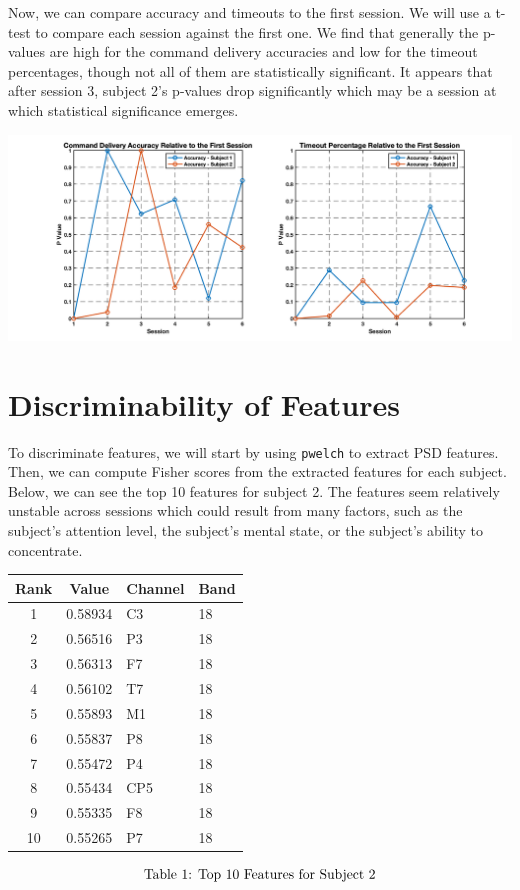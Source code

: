 \documentclass[12pt]{article}
\begin{document}
Now, we can compare accuracy and timeouts to the first session. We will use a t-test to compare each session against the first one. We find that generally the p-values are high for the command delivery accuracies and low for the timeout percentages, though not all of them are statistically significant. It appears that after session 3, subject 2's p-values drop significantly which may be a session at which statistical significance emerges.

\begin{center}
    \includegraphics[width=\textwidth]{1_3.png}
\end{center}

\section{Discriminability of Features}
To discriminate features, we will start by using \texttt{pwelch} to extract PSD features. Then, we can compute Fisher scores from the extracted features for each subject. Below, we can see the top 10 features for subject 2. The features seem relatively unstable across sessions which could result from many factors, such as the subject's attention level, the subject's mental state, or the subject's ability to concentrate.

\begin{center}
    \begin{tabular}{c c l l}
        \toprule
        Rank & Value   & Channel & Band \\
        \midrule
        1    & 0.58934 & C3      & 18   \\
        2    & 0.56516 & P3      & 18   \\
        3    & 0.56313 & F7      & 18   \\
        4    & 0.56102 & T7      & 18   \\
        5    & 0.55893 & M1      & 18   \\
        6    & 0.55837 & P8      & 18   \\
        7    & 0.55472 & P4      & 18   \\
        8    & 0.55434 & CP5     & 18   \\
        9    & 0.55335 & F8      & 18   \\
        10   & 0.55265 & P7      & 18   \\
        \bottomrule
    \end{tabular}
\end{center}
$$\textnormal{Table 1: Top 10 Features for Subject 2}$$
\end{document}
